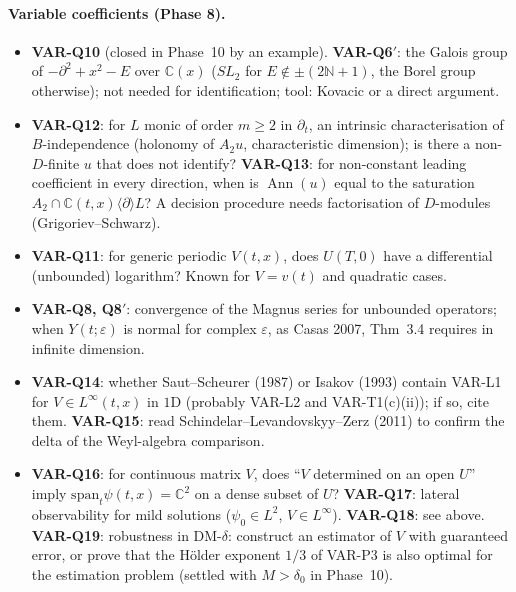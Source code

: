 \documentclass[11pt]{article}
\theoremstyle{plain}
\theoremstyle{definition}
\theoremstyle{remark}
\newcommand{\C}{\mathbb{C}}
\DeclareMathOperator{\Ann}{Ann}             %
\newcommand{\N}{\mathbb{N}}
\begin{document}
\paragraph{Variable coefficients (Phase 8).}
\begin{itemize}
\item \textbf{VAR-Q10} (closed in Phase~10 by an example). \textbf{VAR-Q6$'$}: the Galois group of $-\partial^2+x^2-E$ over $\C(x)$ ($SL_2$ for $E\notin\pm(2\N+1)$, the Borel group otherwise); not needed for identification; tool: Kovacic or a direct argument.
\item \textbf{VAR-Q12}: for $L$ monic of order $m\ge2$ in $\partial_t$, an intrinsic characterisation of $B$-independence (holonomy of $A_2u$, characteristic dimension); is there a non-$D$-finite $u$ that does not identify? \textbf{VAR-Q13}: for non-constant leading coefficient in every direction, when is $\Ann(u)$ equal to the saturation $A_2\cap\C(t,x)\langle\partial\rangle L$? A decision procedure needs factorisation of $D$-modules (Grigoriev--Schwarz).
\item \textbf{VAR-Q11}: for generic periodic $V(t,x)$, does $U(T,0)$ have a differential (unbounded) logarithm? Known for $V=v(t)$ and quadratic cases.
\item \textbf{VAR-Q8, Q8$'$}: convergence of the Magnus series for unbounded operators; when $Y(t;\varepsilon)$ is normal for complex $\varepsilon$, as Casas 2007, Thm~3.4 requires in infinite dimension.
\item \textbf{VAR-Q14}: whether Saut--Scheurer (1987) or Isakov (1993) contain VAR-L1 for $V\in L^\infty(t,x)$ in $1$D (probably VAR-L2 and VAR-T1(c)(ii)); if so, cite them. \textbf{VAR-Q15}: read Schindelar--Levandovskyy--Zerz (2011) to confirm the delta of the Weyl-algebra comparison.
\item \textbf{VAR-Q16}: for continuous matrix $V$, does ``$V$ determined on an open $U$'' imply $\mathrm{span}_t\psi(t,x)=\C^2$ on a dense subset of $U$? \textbf{VAR-Q17}: lateral observability for mild solutions ($\psi_0\in L^2$, $V\in L^\infty$). \textbf{VAR-Q18}: see above. \textbf{VAR-Q19}: robustness in DM-$\delta$: construct an estimator of $V$ with guaranteed error, or prove that the H\"older exponent $1/3$ of VAR-P3 is also optimal for the estimation problem (settled with $M>\delta_0$ in Phase~10).
\end{itemize}
\end{document}
